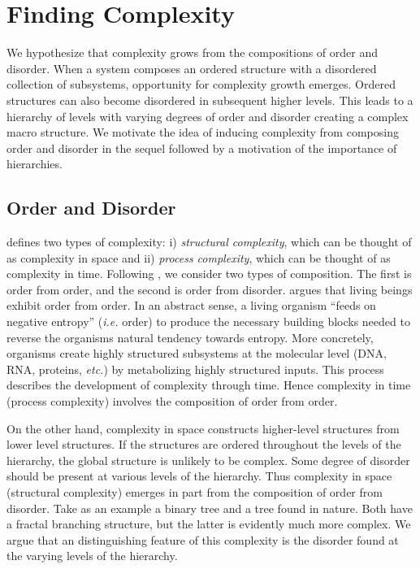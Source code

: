 \section{Finding Complexity}
\label{sec:finding_complexity}

We hypothesize that complexity grows from the compositions of order and
disorder. When a system composes an ordered structure with a disordered
collection of subsystems, opportunity for complexity growth emerges. Ordered
structures can also become disordered in subsequent higher levels. This
leads to a hierarchy of levels with varying degrees of order and disorder
creating a complex macro structure. We motivate the idea of inducing complexity
from composing order and disorder in the sequel followed by a motivation of the
importance of hierarchies.

\subsection{Order and Disorder}

\citet{adami2002complexity} defines two types of complexity: i) \emph{structural
complexity}, which can be thought of as complexity in space and ii)
\emph{process complexity}, which can be thought of as complexity in time.
Following \citet{schrodinger1944}, we consider two types of composition. The
first is order from order, and the second is order from disorder.  \citet[chap.
6]{schrodinger1944} argues that living beings exhibit order from order. In an
abstract sense, a living organism ``feeds on negative entropy'' (\emph{i.e.}
order) to produce the necessary building blocks needed to reverse the organisms
natural tendency towards entropy. More concretely, organisms create highly
structured subsystems at the molecular level (DNA, RNA, proteins, \emph{etc.})
by metabolizing highly structured inputs. This process describes the
development of complexity through time. Hence complexity in time (process
complexity) involves the composition of order from order.

On the other hand, complexity in space constructs higher-level structures from
lower level structures. If the structures are ordered throughout the levels of
the hierarchy, the global structure is unlikely to be complex. Some degree of
disorder should be present at various levels of the hierarchy. Thus complexity
in space (structural complexity) emerges in part from the composition of order
from disorder. Take as an example a binary tree and a tree found in nature.
Both have a fractal branching structure, but the latter is evidently much more
complex. We argue that an distinguishing feature of this complexity is the
disorder found at the varying levels of the hierarchy.

